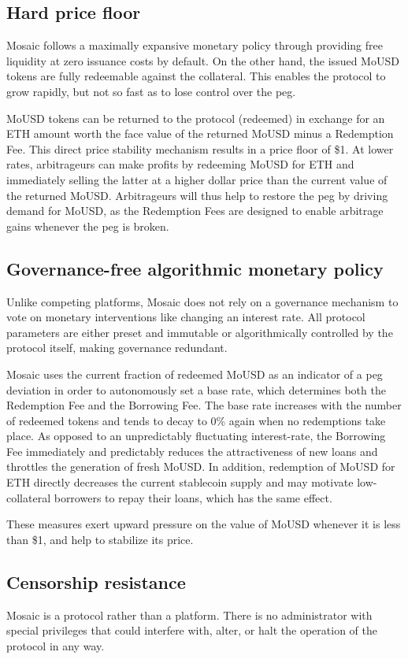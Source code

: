 \documentclass{article}
\begin{document}
\subsection{Hard price floor}
Mosaic follows a maximally expansive monetary policy through providing free liquidity at zero issuance costs by default. On the other hand, the issued MoUSD tokens are fully redeemable against the collateral. This enables the protocol to grow rapidly, but not so fast as to lose control over the peg.

MoUSD tokens can be returned to the protocol (redeemed) in exchange for an ETH amount worth the face value of the returned MoUSD minus a Redemption Fee. This direct price stability mechanism results in a price floor of \$1. At lower rates, arbitrageurs can make profits by redeeming MoUSD for ETH and immediately selling the latter at a higher dollar price than the current value of the returned MoUSD. Arbitrageurs will thus help to restore the peg by driving demand for MoUSD, as the Redemption Fees are designed to enable arbitrage gains whenever the peg is broken.

\subsection{Governance-free algorithmic monetary policy}
Unlike competing platforms, Mosaic does not rely on a governance mechanism to vote on monetary interventions like changing an interest rate. All protocol parameters are either preset and immutable or algorithmically controlled by the protocol itself, making governance redundant.

Mosaic uses the current fraction of redeemed MoUSD as an indicator of a peg deviation in order to autonomously set a base rate, which determines both the Redemption Fee and the Borrowing Fee. The base rate increases with the number of redeemed tokens and tends to decay to 0\% again when no redemptions take place. As opposed to an unpredictably fluctuating interest-rate, the Borrowing Fee immediately and predictably reduces the attractiveness of new loans and throttles the generation of fresh MoUSD. In addition, redemption of MoUSD for ETH directly decreases the current stablecoin supply and may motivate low-collateral borrowers to repay their loans, which has the same effect. 

These measures exert upward pressure on the value of MoUSD whenever it is less than \$1, and help to stabilize its price.

\subsection{Censorship resistance}
Mosaic is a protocol rather than a platform. There is no administrator with special privileges that could interfere with, alter, or halt the operation of the protocol in any way.
\end{document}
